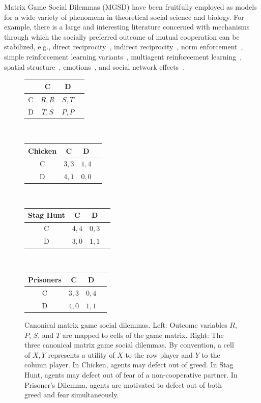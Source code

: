\documentclass{aamas2017}
\begin{document}
Matrix Game Social Dilemmas (MGSD) have been fruitfully employed as models for a wide variety of phenomena in theoretical social science and biology. For example, there is a large and interesting literature concerned with mechanisms through which the socially preferred outcome of mutual cooperation can be stabilized, e.g., direct reciprocity~\cite{trivers1971evolution, Axelrod84, nowak1992tit, nowak1993strategy}, indirect reciprocity~\cite{nowak1998evolution}, norm enforcement~\cite{axelrod1986evolutionary, mahmoud2016cooperation}, simple reinforcement learning variants~\cite{macy2002learning}, multiagent reinforcement learning~\cite{sandholm96,MunozDeCote06,wunder10,Zawadzki14,Bloembergen15}, spatial structure~\cite{nowak1992evolutionary}, emotions~\cite{yu2015emotional}, and social network effects~\cite{ohtsuki2006simple, santos2006new}.

\begin{figure}[t]
\centering
{\normalsize
\begin{tabular}{c|c|c|c|}
  & C & D \\
\hline
C & $R, R$ & $S, T$ \\
\hline
D & $T, S$ & $P, P$ \\
\hline
\end{tabular}
~~ \vline ~~~
\begin{tabular}{c|c|c|c|}
{\small Chicken}  & C & D \\
\hline
C & $3, 3$ & $1, 4$ \\
\hline
D & $4, 1$ & $0, 0$ \\
\hline
\end{tabular}
~~~~~
\begin{tabular}{c|c|c|c|}
 {\small Stag Hunt} & C & D \\
\hline
C & $4, 4$ & $0, 3$ \\
\hline
D & $3, 0$ & $1, 1$ \\
\hline
\end{tabular}
~~~~~
\begin{tabular}{c|c|c|c|}
 {\small Prisoners} & C & D \\
\hline
C & $3 ,3$ & $0, 4$ \\
\hline
D & $4, 0$ & $1, 1$ \\
\hline
\end{tabular}
}
\caption{Canonical matrix game social dilemmas. Left: Outcome variables $R$, $P$, $S$, and $T$ are mapped to cells of the game matrix. Right: The three canonical matrix game social dilemmas.
By convention, a cell of $X,Y$ represents a utility of $X$ to the row player and $Y$ to the column player.
In Chicken, agents may defect out of greed. In Stag Hunt, agents may defect out of fear of a non-cooperative partner. In Prisoner's Dilemma, agents are motivated to defect out of both greed and fear simultaneously.
\label{fig:matrix_games}}
\end{figure}
\end{document}
